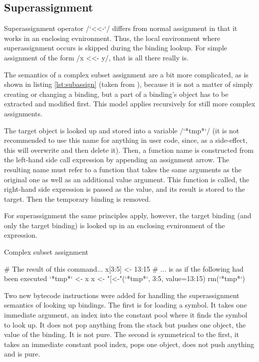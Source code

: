 
\subsection{Superassignment}

Superassignment operator \rinline/`<<-`/ differs from normal assignment in that it works in an enclosing evnironment. Thus, the local environment where superassignment occurs is skipped during the binding lookup. For simple assignment of the form \rinline/x <<- y/, that is all there really is.

The semantics of a complex subset assignment are a bit more complicated, as is shown in listing \ref{lst:subassign} (taken from \autocite{subset}), because it is not a matter of simply creating or changing a binding, but a part of a binding's object has to be extracted and modified first. This model applies recursively for still more complex assignments.

The target object is looked up and stored into a variable \rinline/`*tmp*`/ (it is not recommended to use this name for anything in user code, since, as a side-effect, this will overwrite and then delete it). Then, a function name is constructed from the left-hand side call expression by appending an assignment arrow. The resulting name must refer to a function that takes the same arguments as the original one as well as an additional value argument. This function is called, the right-hand side expression is passed as the value, and its result is stored to the target. Then the temporary binding is removed.

For superassignment the same principles apply, however, the target binding (and only the target binding) is looked up in an enclosing evnironment of the expression.

\begin{listing}[htbp]
  \caption{\label{lst:subassign}Complex subset assignment}
  \begin{rcode}
# The result of this command...
x[3:5] <- 13:15
# ... is as if the following had been executed
`*tmp*` <- x
x <- "[<-"(`*tmp*`, 3:5, value=13:15)
rm(`*tmp*`)
  \end{rcode}
\end{listing}

Two new bytecode instructions were added for handling the superassignment semantics of looking up bindings. The first is for loading a symbol. It takes one immediate argument, an index into the constant pool where it finds the symbol to look up. It does not pop anything from the stack but pushes one object, the value of the binding. It is not pure\todo. The second is symmetrical to the first, it takes an immediate constant pool index, pops one object, does not push anything and is pure.

